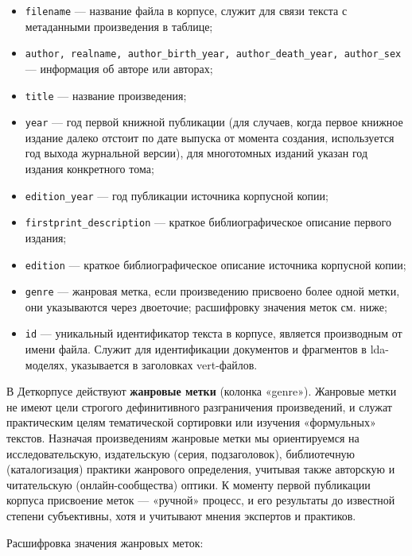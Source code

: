 \documentclass[
]{article}
\providecommand{\tightlist}{%
  \setlength{\itemsep}{0pt}\setlength{\parskip}{0pt}}
\begin{document}
\begin{itemize}
\tightlist
\item
  \texttt{filename} --- название файла в корпусе, служит для связи
  текста с метаданными произведения в таблице;
\item
  \texttt{author,\ realname,\ author\_birth\_year,\ author\_death\_year,\ author\_sex}
  --- информация об авторе или авторах;
\item
  \texttt{title} --- название произведения;
\item
  \texttt{year} --- год первой книжной публикации (для случаев, когда
  первое книжное издание далеко отстоит по дате выпуска от момента
  создания, используется год выхода журнальной версии), для многотомных
  изданий указан год издания конкретного тома;
\item
  \texttt{edition\_year} --- год публикации источника корпусной копии;
\item
  \texttt{firstprint\_description} --- краткое библиографическое
  описание первого издания;
\item
  \texttt{edition} --- краткое библиографическое описание источника
  корпусной копии;
\item
  \texttt{genre} --- жанровая метка, если произведению присвоено более
  одной метки, они указываются через двоеточие; расшифровку значения
  меток см. ниже;
\item
  \texttt{id} --- уникальный идентификатор текста в корпусе, является
  производным от имени файла. Служит для идентификации документов и
  фрагментов в lda-моделях, указывается в заголовках vert-файлов.
\end{itemize}

В Деткорпусе действуют \textbf{жанровые метки} (колонка «genre»).
Жанровые метки не имеют цели строгого дефинитивного разграничения
произведений, и служат практическим целям тематической сортировки или
изучения «формульных» текстов. Назначая произведениям жанровые метки мы
ориентируемся на исследовательскую, издательскую (серия, подзаголовок),
библиотечную (каталогизация) практики жанрового определения, учитывая
также авторскую и читательскую (онлайн-сообщества) оптики. К моменту
первой публикации корпуса присвоение меток --- «ручной» процесс, и его
результаты до известной степени субъективны, хотя и учитывают мнения
экспертов и практиков.

Расшифровка значения жанровых меток:
\end{document}
